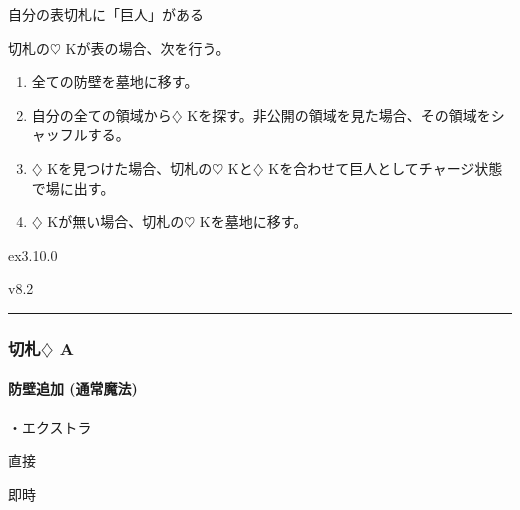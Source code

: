 \documentclass[letterpaper,10pt,dvipdfmx]{sphinxmanual}
\begin{document}
\sphinxAtStartPar
{}

\sphinxAtStartPar
自分の表切札に「巨人」がある

\sphinxAtStartPar
{}

\sphinxAtStartPar
切札の{\normalsize $\heartsuit$} Kが表の場合、次を行う。
\begin{enumerate}
%
\item {} 
\sphinxAtStartPar
全ての防壁を墓地に移す。

\item {} 
\sphinxAtStartPar
自分の全ての領域から{\normalsize $\diamondsuit$} Kを探す。非公開の領域を見た場合、その領域をシャッフルする。

\item {} 
\sphinxAtStartPar
{\normalsize $\diamondsuit$} Kを見つけた場合、切札の{\normalsize $\heartsuit$} Kと{\normalsize $\diamondsuit$} Kを合わせて巨人としてチャージ状態で場に出す。

\item {} 
\sphinxAtStartPar
{\normalsize $\diamondsuit$} Kが無い場合、切札の{\normalsize $\heartsuit$} Kを墓地に移す。

\end{enumerate}

\sphinxAtStartPar
{}  ex3.10.0

\sphinxAtStartPar
{}  v8.2


\bigskip\hrule\bigskip



\subsubsection{切札{\normalsize $\diamondsuit$} A}
\label{\detokenize{auto/frameActionlist:id51}}

\paragraph{防壁追加 (通常魔法)}
\label{\detokenize{auto/frameActionlist:act-putbulwark}}\label{\detokenize{auto/frameActionlist:id52}}
\sphinxAtStartPar
{}

\sphinxAtStartPar
・エクストラ

\sphinxAtStartPar
{} 直接

\sphinxAtStartPar
{} 即時
\end{document}
